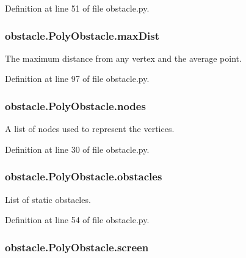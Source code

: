 Definition at line 51 of file obstacle.\-py.

\hypertarget{classobstacle_1_1PolyObstacle_a14e97b3f09f9ff21f36efc7a58759e5c}{
\subsubsection[{max\-Dist}]{\setlength{\rightskip}{0pt plus 5cm}obstacle.\-Poly\-Obstacle.\-max\-Dist}}\label{classobstacle_1_1PolyObstacle_a14e97b3f09f9ff21f36efc7a58759e5c}


The maximum distance from any vertex and the average point. 



Definition at line 97 of file obstacle.\-py.

\hypertarget{classobstacle_1_1PolyObstacle_a125762f0b4a3c9ef8d75c81bc5bc608e}{
\subsubsection[{nodes}]{\setlength{\rightskip}{0pt plus 5cm}obstacle.\-Poly\-Obstacle.\-nodes}}\label{classobstacle_1_1PolyObstacle_a125762f0b4a3c9ef8d75c81bc5bc608e}


A list of nodes used to represent the vertices. 



Definition at line 30 of file obstacle.\-py.

\hypertarget{classobstacle_1_1PolyObstacle_a7df678f9d9362489ba24e0dd9ed70efc}{
\subsubsection[{obstacles}]{\setlength{\rightskip}{0pt plus 5cm}obstacle.\-Poly\-Obstacle.\-obstacles}}\label{classobstacle_1_1PolyObstacle_a7df678f9d9362489ba24e0dd9ed70efc}


List of static obstacles. 



Definition at line 54 of file obstacle.\-py.

\hypertarget{classobstacle_1_1PolyObstacle_ad65d210c167b0638ef317ef24670501c}{
\subsubsection[{screen}]{\setlength{\rightskip}{0pt plus 5cm}obstacle.\-Poly\-Obstacle.\-screen}}\label{classobstacle_1_1PolyObstacle_ad65d210c167b0638ef317ef24670501c}


